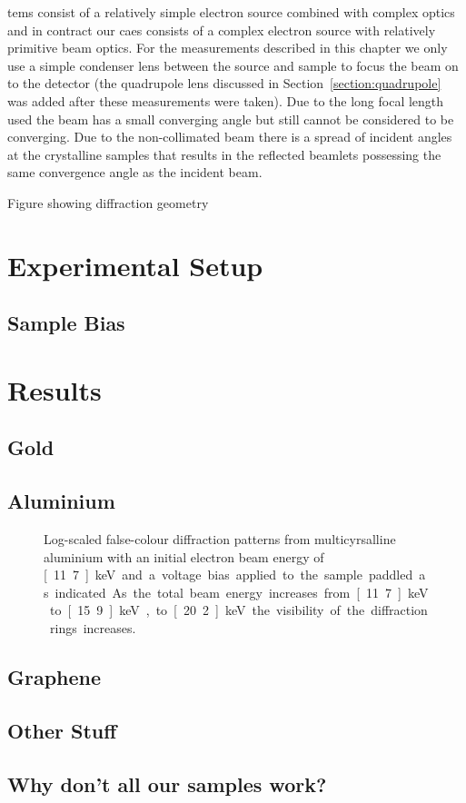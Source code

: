\Glspl{tem} consist of a relatively simple electron source combined with complex optics and in contract our \gls{caes} consists of a complex electron source with relatively primitive beam optics.
For the measurements described in this chapter we only use a simple condenser lens between the source and sample to focus the beam on to the detector (the quadrupole lens discussed in Section~\ref{section:quadrupole} was added after these measurements were taken).
Due to the long focal length used the beam has a small converging angle but still cannot be considered to be converging.
Due to the non-collimated beam there is a spread of incident angles at the crystalline samples that results in the reflected beamlets possessing the same convergence angle as the incident beam.

{\color{red}Figure showing diffraction geometry}

\section{Experimental Setup}

\subsection{Sample Bias}\label{section:sample_bias}

\section{Results}

\subsection{Gold}

\subsection{Aluminium}

\begin{figure}
    \center
    
    \caption{Log-scaled false-colour diffraction patterns from multicyrsalline aluminium with an initial electron beam energy of \unit[11.7]{keV} and a voltage bias applied to the sample paddled as indicated. As the total beam energy increases from \unit[11.7]{keV} to \unit[15.9]{keV}, to \unit[20.2]{keV} the visibility of the diffraction rings increases.}
    \label{figure:al_diffraction}
\end{figure}

\subsection{Graphene}

\subsection{Other Stuff}

\subsection{Why don't all our samples work?}